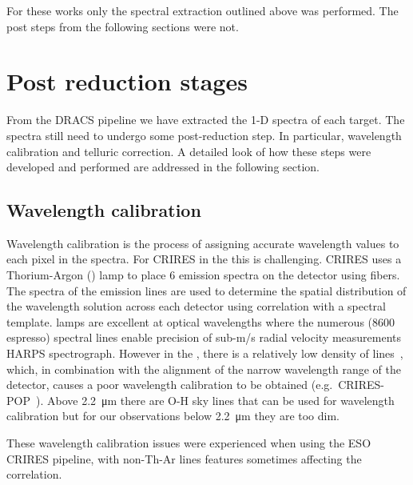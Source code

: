 For these works only the spectral extraction outlined above was performed. The post  steps from the following sections were not.


\section{Post reduction stages}
\label{sec:posreduction}
From the DRACS pipeline we have extracted the 1-D spectra of each target. The spectra still need to undergo some post-reduction step. In particular, wavelength calibration and telluric correction. A detailed look of how these steps were developed and performed are addressed in the following section.

\subsection{Wavelength calibration}
\label{subsec:wavecalib}
Wavelength calibration is the process of assigning accurate wavelength values to each pixel in the spectra. For CRIRES in the {\nir} this is challenging. CRIRES uses a Thorium-Argon (\thar) lamp to place 6 emission spectra on the detector using fibers. The spectra of the {\thar} emission lines are used to determine the spatial distribution of the wavelength solution across each detector using correlation with a spectral template.  lamps are excellent at optical wavelengths where the numerous (8600 espresso) spectral lines enable precision of sub-m/s radial velocity measurements HARPS spectrograph. However in the {\nir}, there is a relatively low density of {\thar} lines~\citep{kerber_laboratory_2009}, which, in combination with the alignment of the narrow wavelength range of the detector, causes a poor wavelength calibration to be obtained (e.g.\ CRIRES-POP~\citep{nicholls_crirespop_2017}).
Above 2.2~\si{\micro\meter} there are {O-H} sky lines that can be used for wavelength calibration but for our observations below 2.2~\si{\micro\meter} they are too dim.

These wavelength calibration issues were experienced when using the ESO CRIRES pipeline, with non-Th-Ar lines features sometimes affecting the correlation.

